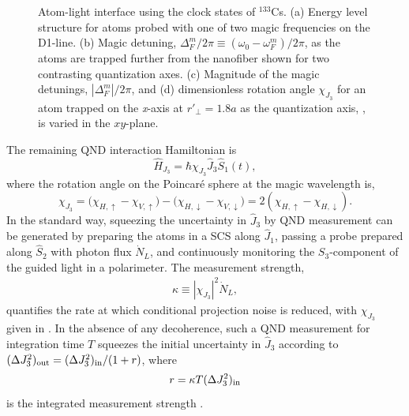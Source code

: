 \documentclass[preprint, aps,pra,onecolumn]{revtex4-1} %
\newcommand{\inp}{{\rm in}}
\newcommand{\jx}{\hat{J}_1}
\newcommand{\jz}{\hat{J}_3}
\newcommand{\magic}[1]{\omega_{#1}^m}
\newcommand{\chieff}{\chi_{J_3}}
\begin{document}
\begin{figure}
\caption{Atom-light interface using the clock states of $^{133}$Cs.  
(a) Energy level structure for atoms probed with one of two magic frequencies on the D1-line. 
(b) Magic detuning, $\Delta^m_{F}/2\pi \equiv (\omega_{0} - \magic{F})/2\pi$, as the atoms are trapped further from the nanofiber shown for two contrasting quantization axes. 
(c) Magnitude of the magic detunings, $|\Delta^m_{F}|/2\pi$, and (d) dimensionless rotation angle $\chieff$ for an atom trapped on the \emph{x}-axis at $ r'\!_\perp=1.8a $ as the quantization axis, , is varied in the $xy$-plane. }\label{Fig::CouplingStrength}
\end{figure}



The remaining QND interaction Hamiltonian is
	\begin{equation} \label{Eq::FaradayHam}
		\hat{H}_{J_3} = \hbar \chieff \jz \hat{S}_1(t),
	\end{equation}
where the rotation angle on the Poincar\'{e} sphere at the magic wavelength is,
\begin{equation}\label{eq:chiJ3}
\chieff = \big( \chi_{H, \uparrow} - \chi_{V,\uparrow} \big) - \big(\chi_{H,\downarrow} - \chi_{V,\downarrow} \big) = 2(\chi_{H, \uparrow}-\chi_{H, \downarrow}).
\end{equation}
In the standard way, squeezing the uncertainty in $\jz$ by QND measurement can be generated by preparing the atoms in a SCS along $\jx$, passing a probe prepared along $\hat{S}_2$ with photon flux $\dot{N}_L$, and continuously monitoring the $S_3$-component of the guided light in a polarimeter. The measurement strength,
	\begin{align} \label{Eq::MeasurementStrength}
		\kappa \equiv |\chieff|^2 \dot{N}_L, 
	\end{align}
quantifies the rate at which conditional projection noise is reduced, with $\chieff$ given in . 
In the absence of any decoherence, such a QND measurement for integration time $T$ squeezes the initial uncertainty in $\jz$ according to $(\Delta J_3^2)_{\rm out}= (\Delta J_3^2)_{\rm in}/(1+r)$, where
	\begin{equation}
		r = \kappa T  (\Delta J_3^2)_{\inp}
	\end{equation}
is the integrated measurement strength \cite{hammerer_quantum_2010, baragiola_three-dimensional_2014}.
\end{document}
